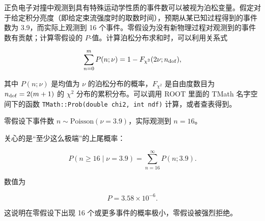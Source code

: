 \begin{question}
正负电子对撞中观测到具有特殊运动学性质的事件数可以被视为泊松变量。假定对于给定积分亮度（即给定束流强度时的取数时间），预期从某已知过程得到的事件数为
3.9，而实际上观测到 16
个事件。零假设为没有新物理过程对观测到的事件数有贡献；计算零假设的
\(P\)-值。计算泊松分布求和时，可以利用关系式

\[
\sum_{n=0}^{m}P(n;\nu)=1-F_{\chi^2}(2\nu;n_{\rm dof}),
\]

其中 \(P(n;\nu)\) 是均值为 \(\nu\) 的泊松分布的概率，\(F_{\chi^2}\)
是自由度数目为 \(n_{\rm dof}=2(m+1)\) 的 \(\chi^2\)
分布的累积分布。可以调用 ROOT 里面的 TMath 名字空间下的函数
\texttt{TMath::Prob(double\ chi2,\ int\ ndf)} 计算，或者查表得到。
\begin{solution}
零假设下事件数 \(n\sim \mathrm{Poisson}(\nu=3.9)\)，实际观测到
\(n=16\)。

关心的是``至少这么极端''的上尾概率：

\[
P(n\ge 16\mid \nu=3.9)=\sum_{n=16}^{\infty} P(n;3.9).
\]

数值为

\[
P=3.58\times 10^{-6}.
\]

这说明在零假设下出现 16 个或更多事件的概率极小，零假设被强烈拒绝。
\end{solution}
\end{question}


